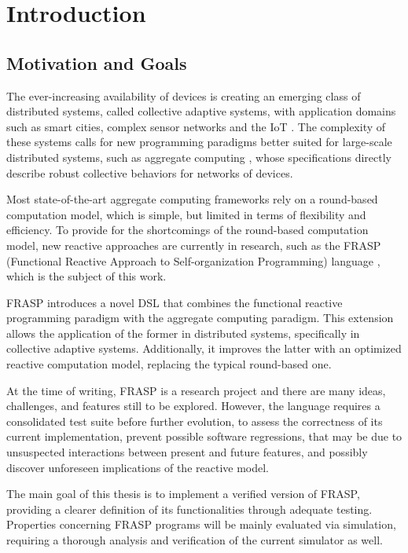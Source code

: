 
\chapter{Introduction}
\label{chapter:introduction}

\section{Motivation and Goals}
\label{section:introduction:content}

The ever-increasing availability of devices is creating an emerging class of
distributed systems, called collective adaptive systems, with application
domains such as smart cities, complex sensor networks and the \ac{IoT}
\cite{CAS-AggregateComputingBlocks}. The complexity of these systems calls for
new programming paradigms better suited for large-scale distributed systems,
such as aggregate computing \cite{FieldCalculus-AggregateComputing}, whose
specifications directly describe robust collective behaviors for networks of
devices.

Most state-of-the-art aggregate computing frameworks rely on a round-based
computation model, which is simple, but limited in terms of flexibility and
efficiency. To provide for the shortcomings of the round-based computation
model, new reactive approaches are currently in research, such as the FRASP
(Functional Reactive Approach to Self-organization Programming) language
\cite{FRASP}, which is the subject of this work.

FRASP introduces a novel \ac{DSL} that combines the functional reactive
programming paradigm with the aggregate computing para\-digm. This extension
allows the application of the former in distributed systems, specifically in
collective adaptive systems. Additionally, it improves the latter with an
optimized reactive computation model, replacing the typical round-based one.

At the time of writing, FRASP is a research project and there are many ideas,
challenges, and features still to be explored. However, the language requires a
consolidated test suite before further evolution, to assess the correctness of
its current implementation, prevent possible software regressions, that may be
due to unsuspected interactions between present and future features, and
possibly discover unforeseen implications of the reactive model.

The main goal of this thesis is to implement a verified version of FRASP,
providing a clearer definition of its functionalities through adequate testing.
Properties concerning FRASP programs will be mainly evaluated via simulation,
requiring a thorough analysis and verification of the current simulator as
well.

